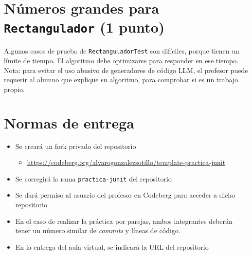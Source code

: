\documentclass[a4paper]{article}
\begin{document}
\section{Números grandes para \texttt{Rectangulador} (1 punto)}
\label{sec:org0000009}
Algunos casos de prueba de \texttt{RectanguladorTest} son difíciles, porque tienen un límite de tiempo. El algoritmo debe optimizarse para responder en ese tiempo.
Nota: para evitar el uso abusivo de generadores de código LLM, el profesor puede requerir al alumno que explique su algoritmo, para comprobar si es un trabajo propio.
\section{Normas de entrega}
\label{sec:org000000c}
\begin{itemize}
\item Se creará un fork privado del repositorio
\begin{itemize}
\item \url{https://codeberg.org/alvarogonzalezsotillo/template-practica-junit}
\end{itemize}
\item Se corregirá la rama \texttt{practica-junit} del repositorio
\item Se dará permiso al usuario del profesor en Codeberg para acceder a dicho repositorio
\item En el caso de realizar la práctica por parejas, ambos integrantes deberán tener un número similar de \emph{commits} y líneas de código.
\item En la entrega del aula virtual, se indicará la URL del repositorio
\end{itemize}
\end{document}
